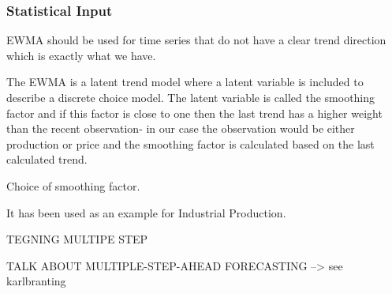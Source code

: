 \subsubsection{Statistical Input}

EWMA should be used for time series that do not have a clear trend direction\cite[Chapter~7.3.2]{econometrics} which is exactly what we have. 

The EWMA is a latent trend model where a latent variable is included to describe a discrete choice model. The latent variable is called the smoothing factor and if this factor is close to one then the last trend has a higher weight than the recent observation- in our case the observation would be either production or price and the smoothing factor is calculated based on the last calculated trend.

Choice of smoothing factor.

It has been used as an example for Industrial Production. 

TEGNING MULTIPE STEP

TALK ABOUT MULTIPLE-STEP-AHEAD FORECASTING --> see karlbranting

